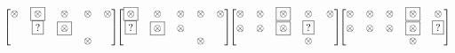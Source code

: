 \begin{equation*}
\begin{blockarray}{ccccc}
\begin{block}{[ccccc]}
 \otimes & \boxed{\otimes} & \otimes & \otimes & \otimes \\
  & \boxed{?} & \boxed{\otimes} &  &  \\
  &  &  & \otimes &  \\
\end{block}
\end{blockarray}
\begin{blockarray}{ccccc}
\begin{block}{[ccccc]}
 \boxed{\otimes} & \otimes & \otimes & \otimes & \otimes \\
 \boxed{?} & \boxed{\otimes} & \otimes &  &  \\
  &  &  & \otimes &  \\
\end{block}
\end{blockarray}
\begin{blockarray}{ccccc}
\begin{block}{[ccccc]}
  \otimes & \otimes & \boxed{\otimes} & \otimes & \otimes \\
  \otimes & \otimes & \boxed{\otimes} & \boxed{?} &  \\
   &  &   & \otimes &  \\
\end{block}
\end{blockarray}
\begin{blockarray}{ccccc}
\begin{block}{[ccccc]}
  \otimes & \otimes & \otimes & \boxed{\otimes} & \otimes \\
  \otimes & \otimes & \otimes & \boxed{\otimes} & \boxed{?} \\
   &  &  & \otimes &  \\
\end{block}
\end{blockarray}
\end{equation*}
